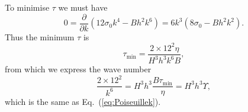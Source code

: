 \documentclass[12pt,a4paper]{revtex4}
\begin{document}
To minimise $\tau$ we must have
\begin{equation}
0 = \frac{\partial}{\partial k}\left(12 \sigma_0 k^4 - B h^2 k^6\right) = 6k^3\left( 8 \sigma_0 - B h^2 k^2\right).
\end{equation}
Thus the minimum $\tau$ is
\begin{equation}
\tau_\text{min} = \frac{2\times12^2\eta}{H^3 h^3 k^6 B},
\end{equation}
from which we express the wave number
\begin{equation}
\frac{2\times 12^2}{k^6} = H^3 h^3 \frac{B\tau_\text{min}}{\eta} = H^3 h^3  \Upsilon,
\end{equation}
which is the same as Eq.~(\ref{eq:Poiseuillek}).


\end{document}
